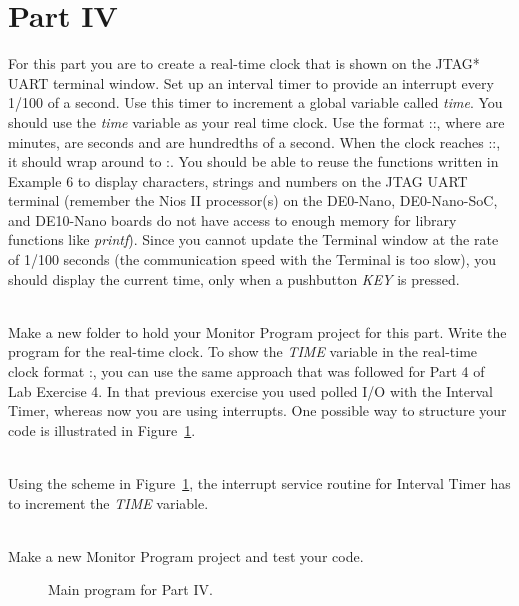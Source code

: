 \documentclass[epsfig,10pt,fullpage]{article}
\newcommand{\CommonDocsPath}{../../../../common/docs}
\begin{document}
\newpage
\section*{ Part IV}
For this part you are to create a real-time clock that is shown on the JTAG* UART terminal window.
Set up an interval timer to provide an interrupt every 1/100 of a second. Use this
timer to increment a global variable called {\it time}. You should use the {\it time} variable as your real time clock.
Use the format ::, where  are minutes,  are seconds and  are hundredths of a second.
When the clock reaches ::, it should wrap around to :. 
You should be able to reuse the functions written in Example 6 to display 
characters, strings and numbers on the JTAG UART terminal (remember the Nios II processor(s) on the DE0-Nano, 
DE0-Nano-SoC, and DE10-Nano boards do not have access to enough memory for library functions like {\it printf}).
Since you cannot update the Terminal window at the rate of 1/100 seconds 
(the communication speed with the Terminal is too slow), you should display the current time, 
only when a pushbutton {\it KEY} is pressed.

~\\
Make a new folder to hold your Monitor Program project for this part. Write the program for the
real-time clock. To show the {\it TIME} variable in the real-time clock format
:, you can use the same approach that was followed for Part 4 of Lab Exercise 4.
In that previous exercise you used polled I/O with the Interval Timer,
whereas now you are using interrupts. One possible way to structure your code is illustrated in
Figure~\ref{fig:code3}. 

~\\
Using the scheme in Figure~\ref{fig:code3}, the interrupt service routine for  
Interval Timer has to increment the {\it TIME} variable.

~\\
Make a new Monitor Program project and test your code. 

\begin{figure}[H]
\begin{center}

\end{center}
\vspace{-0.5cm}\caption{Main program for Part IV.}
\label{fig:code3}
\end{figure}




\end{document}
